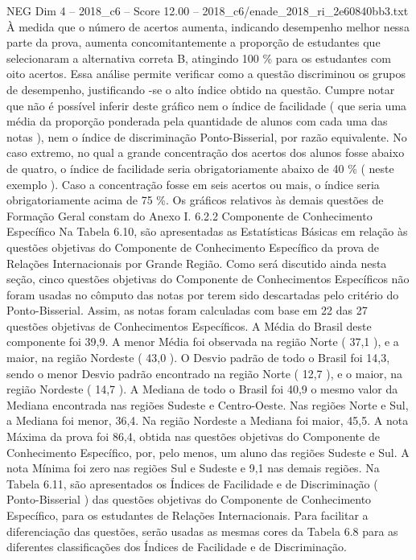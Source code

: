 \begin{textsample}{NEG Dim 4 – 2018\_c6 – Score 12.00 – 2018\_c6/enade\_2018\_ri\_2e60840bb3.txt}
À medida que o número de acertos aumenta, indicando desempenho melhor nessa parte da prova, aumenta concomitantemente a proporção de estudantes que selecionaram a alternativa correta B, atingindo 100 \% para os estudantes com oito acertos.
Essa análise permite verificar como a questão discriminou os grupos de desempenho, justificando -se o alto índice obtido na questão.
Cumpre notar que não é possível inferir deste gráfico nem o índice de facilidade ( que seria uma média da proporção ponderada pela quantidade de alunos com cada uma das notas ), nem o índice de discriminação Ponto-Bisserial, por razão equivalente.
No caso extremo, no qual a grande concentração dos acertos dos alunos fosse abaixo de quatro, o índice de facilidade seria obrigatoriamente abaixo de 40 \% ( neste exemplo ).
Caso a concentração fosse em seis acertos ou mais, o índice seria obrigatoriamente acima de 75 \%.
Os gráficos relativos às demais questões de Formação Geral constam do Anexo I. 6.2.2 Componente de Conhecimento Específico Na Tabela 6.10, são apresentadas as Estatísticas Básicas em relação às questões objetivas do Componente de Conhecimento Específico da prova de Relações Internacionais por Grande Região.
Como será discutido ainda nesta seção, cinco questões objetivas do Componente de Conhecimentos Específicos não foram usadas no cômputo das notas por terem sido descartadas pelo critério do Ponto-Bisserial.
Assim, as notas foram calculadas com base em 22 das 27 questões objetivas de Conhecimentos Específicos.
A Média do Brasil deste componente foi 39,9.
A menor Média foi observada na região Norte ( 37,1 ), e a maior, na região Nordeste ( 43,0 ).
O Desvio padrão de todo o Brasil foi 14,3, sendo o menor Desvio padrão encontrado na região Norte ( 12,7 ), e o maior, na região Nordeste ( 14,7 ).
A Mediana de todo o Brasil foi 40,9 o mesmo valor da Mediana encontrada nas regiões Sudeste e Centro-Oeste.
Nas regiões Norte e Sul, a Mediana foi menor, 36,4.
Na região Nordeste a Mediana foi maior, 45,5.
A nota Máxima da prova foi 86,4, obtida nas questões objetivas do Componente de Conhecimento Específico, por, pelo menos, um aluno das regiões Sudeste e Sul.
A nota Mínima foi zero nas regiões Sul e Sudeste e 9,1 nas demais regiões.
Na Tabela 6.11, são apresentados os Índices de Facilidade e de Discriminação ( Ponto-Bisserial ) das questões objetivas do Componente de Conhecimento Específico, para os estudantes de Relações Internacionais.
Para facilitar a diferenciação das questões, serão usadas as mesmas cores da Tabela 6.8 para as diferentes classificações dos Índices de Facilidade e de Discriminação.

\end{textsample}
